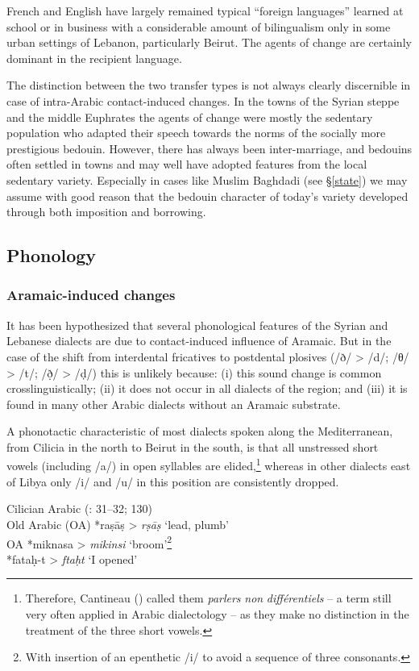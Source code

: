 \documentclass[output=paper]{langsci/langscibook}
\begin{document}
French and English have largely remained typical “foreign languages” learned at school or in business with a considerable amount of bilingualism only in some urban settings of Lebanon, particularly Beirut. The agents of change are certainly dominant in the recipient language. 

The distinction between the two transfer types is not always clearly discernible in case of intra-Arabic contact-induced changes. In the towns of the Syrian steppe and the middle Euphrates the agents of change were mostly the sedentary population who adapted their speech towards the norms of the socially more prestigious bedouin. However, there has always been inter-marriage, and bedouins often settled in towns and may well have adopted features from the local sedentary variety. Especially in cases like Muslim Baghdadi (see §\ref{state}) we may assume with good reason that the bedouin character of today’s variety developed through both imposition and borrowing. 

  \subsection{Phonology} 
 \subsubsection{Aramaic-induced changes} 

It has been hypothesized that several phonological features of the Syrian and Lebanese dialects are due to contact-induced influence of Aramaic. But in the case of the shift from interdental fricatives to postdental plosives (/ð/ > /d/; /θ/ > /t/; /ð̣/ > /ḍ/) this is unlikely because: (i) this sound change is common crosslinguistically; (ii) it does not occur in all dialects of the region; and (iii) it is found in many other Arabic dialects without an Aramaic substrate. 

A phonotactic characteristic of most dialects spoken along the Mediterranean, from Cilicia in the north to Beirut in the south, is that all unstressed short vowels (including /a/) in open syllables are elided,\footnote{Therefore, Cantineau (\citeyear[108]{Cantineau1960}) called them \textit{parlers} \textit{non} \textit{différentiels} – a term still very often applied in Arabic dialectology – as they make no distinction in the treatment of the three short vowels.} whereas in other dialects east of Libya only /i/ and /u/ in this position are consistently dropped.

\ea
{Cilician Arabic (\citealt{Procházka2002Cukurova}: 31--32; 130)}\\
  \textup{Old Arabic (OA)} *raṣāṣ > \textit{rṣāṣ}  \textup{‘lead, plumb’\\
OA} *miknasa > \textit{mikinsi} ‘\textup{broom’}\footnote{With insertion of an epenthetic /i/ to avoid a sequence of three consonants.}\\
*fataḥ-t > \textit{ftaḥt} ‘\textup{I opened’}\\
  \z
  
\end{document}
